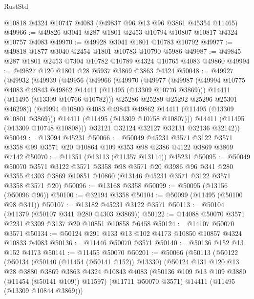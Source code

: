 \begin{lexlean}{RustStd}
\begin{coremodule}
    @10818
    @4324
    @10747
    @4083
    (@49837 @96 @13 @96 @3861 @45354 @11465)
@49966 := @49826 @3041 @287 @1801 @2453 @10794 @10807 @10817 @4324 @10757 @4083
@49970 := @49928 @3041 @1801 @10783 @10792
@49977 := @49818 @1877 @3040 @2454 @1801 @10783 @10790 @5986
@49987 := @49845 @287 @1801 @2453 @7304 @10782 @10789 @4324 @10765 @4083 @49860
@49994 := @49827 @120 @1801 @28 @5937 @3869 @3863 @4324
@50048 := @49927
    (@49932
      (@49939
        (@49956
          (@49966
            (@49970
              (@49977
                (@49987
                  (@49994 @10775 @4083 @49843 @49862 @14411 (@11495 (@13309 @10776 @3869)))
                  @14411
                  (@11495 (@13309 @10766 @10782)))
                @25286
                @25289
                @25292
                @25296
                @25301
                @46298))
            (@49994 @10800 @4083 @49843 @49862 @14411 (@11495 (@13309 @10801 @3869)))
            @14411
            (@11495 (@13309 @10758 @10807)))
          @14411
          (@11495 (@13309 @10748 @10808)))
        @32121
        @32124
        @32127
        @32131
        @32136
        @32142))
@50049 := @13094 @45231
@50066 := @50049
    @45231
    @3571
    @3122
    @3571
    @3358
    @99
    @3571
    @20
    @10864
    @109
    @353
    @98
    @2386
    @4122
    @3869
    @3869
    @7142
@50070 := @11351 (@13113 (@11357 @13114)) @45231
@50095 := @50049
    @50070
    @3571
    @3122
    @3571
    @3358
    @98
    @3571
    @20
    @3986
    @96
    @341
    @280
    @3355
    @4303
    @3869
    @10851
    @10860
    (@13146 @45231 @3571 @3122 @3571 @3358 @3571 @20)
@50096 := @13168 @3358
@50099 := @50095 (@13156 (@50096 @96))
@50100 := @32194 @3358
@50104 := @50099 (@11495 (@50100 @98 @341))
@50107 := @13182 @45231 @3122 @3571
@50113 := @50104 (@11379 (@50107 @341 @280 @4303 @3869))
@50122 := @14088 @50070 @3571 @2231 @3309 @3137 @20 @10851 @10858 @6458
@50124 := @14107 @50070 @3571
@50134 := @50124 @291 @133 @13 @102 @4173 @10850 @10857 @4324 @10833 @4083
@50136 := @11446 @50070 @3571
@50140 := @50136 @152 @13 @152 @4173
@50141 := @11455 @50070
@50201 := @50066
    (@50113
      (@50122
        (@50134
          (@50140 (@11454 (@50141 @152)) @13330)
          (@50124
            @131
            @120
            @13
            @28
            @3880
            @3869
            @3863
            @4324
            @10843
            @4083
            (@50136 @109 @13 @109 @3880 (@11454 (@50141 @109)) @11597)
            (@11711 @50070 @3571)
            @14411
            (@11495 (@13309 @10844 @3869)))

\end{coremodule}
\end{lexlean}
